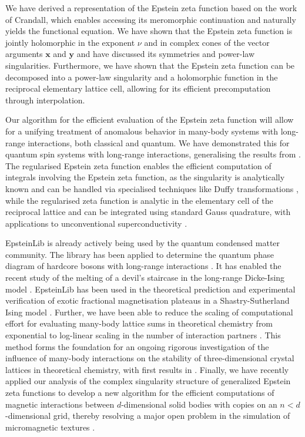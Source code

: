 \documentclass[]{amsart}
\newcommand{\new}[1]{#1}
\numberwithin{mythm}{section}
\begin{document}
We have derived a representation of the Epstein zeta function based on the work of Crandall, which enables accessing its meromorphic continuation and naturally yields the functional equation.
We have shown that the Epstein zeta function is jointly holomorphic in the exponent $\nu$ and in complex cones of the vector arguments $\bm x$ and $\bm y$ and have discussed its symmetries and power-law singularities.
Furthermore, we have shown that the Epstein zeta function can be decomposed into a power-law singularity
and a holomorphic function in the reciprocal elementary lattice cell, allowing for its efficient precomputation through interpolation.

Our algorithm for the efficient evaluation of the Epstein zeta function
will allow for a unifying treatment of anomalous behavior in many-body systems with long-range interactions, both classical and quantum. We have demonstrated this for quantum spin systems with long-range interactions, generalising the results from  \cite{yusuf2004spin,peter2012anomalous}. The regularised Epstein zeta function enables the efficient computation of integrals involving the Epstein zeta function, as the singularity is analytically known and can be handled via specialised techniques like Duffy transformations \cite{duffy1982quadrature}, while the regularised zeta function is 
analytic in the elementary cell of the reciprocal lattice
and can be integrated using standard Gauss quadrature, with applications to unconventional superconductivity \cite{buchheit2023exact}. 

EpsteinLib \cite{epsteinlib} is already actively being used by the quantum condensed matter community. 
The library has been applied to determine the quantum phase diagram of hardcore bosons with long-range interactions \cite{koziol2023quantum}.
It has enabled the recent study of the melting of a devil's staircase in the long-range Dicke-Ising model \cite{koziol2025melting}.
EpsteinLib has been used in the theoretical prediction and experimental verification of exotic fractional magnetisation plateaus in a Shastry-Sutherland Ising model \cite{yadav2024observation}.
Further, we have been able to reduce the scaling of computational effort for evaluating many-body lattice sums in theoretical chemistry from exponential to log-linear scaling in the number of interaction partners \cite{buchheitEpsteinZetaMethod2025}.
This method forms the foundation for an ongoing rigorous investigation of the influence of many-body interactions on the stability of \new{three-dimensional} crystal lattices in theoretical chemistry, with first results in \cite{robles-navarroExactLatticeSummations2025}. \new{Finally, we have recently applied our analysis of the complex singularity structure of generalized Epstein zeta functions to develop a new algorithm for the efficient computations of magnetic interactions between $d$-dimensional solid bodies with copies on an $n<d$-dimensional grid, thereby resolving a major open problem in the simulation of micromagnetic textures \cite{buchheitZetaExpansionLongrange2025}.}
\end{document}
